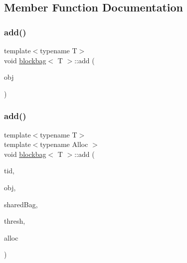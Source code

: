 \subsection{Member Function Documentation}
\mbox{\label{classblockbag_a8cb3c434b92a6e58a47bc235d0c2a91c}} 
\subsubsection{\texorpdfstring{add()}{add()}\hspace{0.1cm}{\footnotesize\ttfamily [1/2]}}
{\footnotesize\ttfamily template$<$typename T$>$ \\
void \hyperlink{classblockbag}{blockbag}$<$ T $>$\+::add (\begin{DoxyParamCaption}\item[{T $\ast$const}]{obj }\end{DoxyParamCaption})\hspace{0.3cm}{\ttfamily [inline]}}

\mbox{\label{classblockbag_a4ae5f3f6ef5fd7d458abf39aae9c9b75}} 
\subsubsection{\texorpdfstring{add()}{add()}\hspace{0.1cm}{\footnotesize\ttfamily [2/2]}}
{\footnotesize\ttfamily template$<$typename T$>$ \\
template$<$typename Alloc $>$ \\
void \hyperlink{classblockbag}{blockbag}$<$ T $>$\+::add (\begin{DoxyParamCaption}\item[{const int}]{tid,  }\item[{T $\ast$const}]{obj,  }\item[{\hyperlink{classlockfreeblockbag}{lockfreeblockbag}$<$ T $>$ $\ast$const}]{shared\+Bag,  }\item[{const int}]{thresh,  }\item[{Alloc $\ast$const}]{alloc }\end{DoxyParamCaption})\hspace{0.3cm}{\ttfamily [inline]}}

\mbox{\label{classblockbag_ab8fa06856490589dd63e2c8058b3db63}} 
